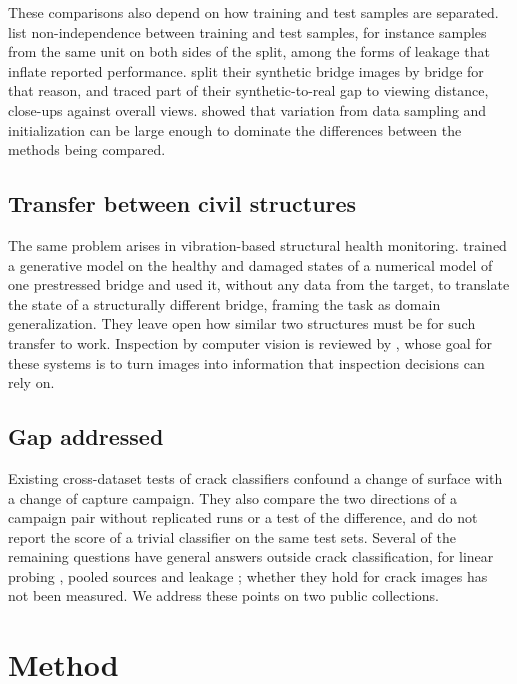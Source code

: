 \documentclass[pdflatex,sn-apa]{sn-jnl}
\begin{document}
These comparisons also depend on how training and test samples are separated. \citet{kapoor2023} list non-independence between training and test samples, for instance samples from the same unit on both sides of the split, among the forms of leakage that inflate reported performance. \citet{fountoukidou2024} split their synthetic bridge images by bridge for that reason, and traced part of their synthetic-to-real gap to viewing distance, close-ups against overall views. \citet{bouthillier2021} showed that variation from data sampling and initialization can be large enough to dominate the differences between the methods being compared.

\subsection{Transfer between civil structures}\label{sec:related-civil}

The same problem arises in vibration-based structural health monitoring. \citet{luleci2023} trained a generative model on the healthy and damaged states of a numerical model of one prestressed bridge and used it, without any data from the target, to translate the state of a structurally different bridge, framing the task as domain generalization. They leave open how similar two structures must be for such transfer to work. Inspection by computer vision is reviewed by \citet{spencer2019}, whose goal for these systems is to turn images into information that inspection decisions can rely on.

\subsection{Gap addressed}\label{sec:gap}

Existing cross-dataset tests of crack classifiers \citep{ozgenel2018, rashid2025} confound a change of surface with a change of capture campaign. They also compare the two directions of a campaign pair without replicated runs or a test of the difference, and do not report the score of a trivial classifier on the same test sets. Several of the remaining questions have general answers outside crack classification, for linear probing \citep{kumar2022}, pooled sources \citep{gulrajani2021} and leakage \citep{kapoor2023}; whether they hold for crack images has not been measured. We address these points on two public collections.

\section{Method}\label{sec:method}
\end{document}
